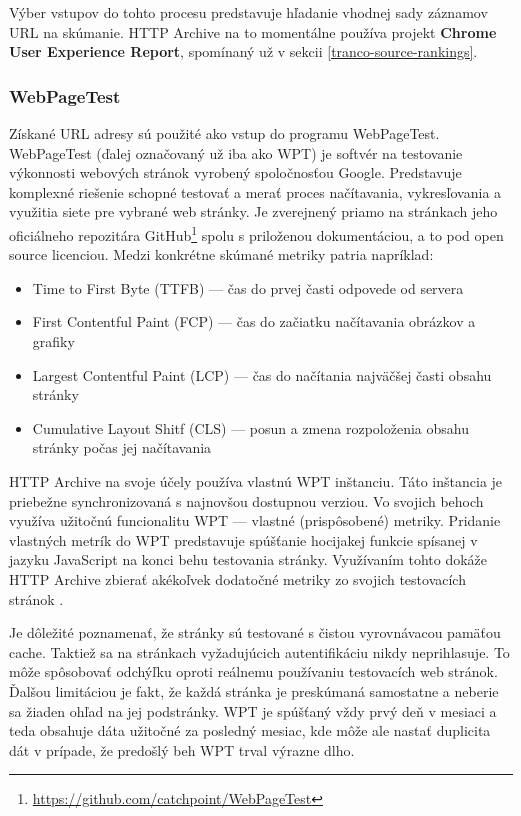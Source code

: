 Výber vstupov do tohto procesu predstavuje hľadanie vhodnej sady záznamov URL na skúmanie. 
HTTP Archive na to momentálne používa projekt \textbf{Chrome User Experience Report}, spomínaný už v sekcii \ref{tranco-source-rankings}.

\subsubsection{WebPageTest}

Získané URL adresy sú použité ako vstup do programu WebPageTest. WebPageTest (ďalej označovaný už iba ako WPT) je softvér na testovanie výkonnosti webových stránok vyrobený spoločnosťou Google. 
Predstavuje komplexné riešenie schopné testovať a merať proces načítavania, vykresľovania a využitia siete pre vybrané web stránky. 
Je zverejnený priamo na stránkach jeho oficiálneho repozitára GitHub\footnote{\href{https://github.com/catchpoint/WebPageTest}{https://github.com/catchpoint/WebPageTest}} spolu s priloženou dokumentáciou, a to pod open source licenciou.
Medzi konkrétne skúmané metriky patria napríklad: \cite{webpagetest}
\begin{itemize}
    \item Time to First Byte (TTFB) --- čas do prvej časti odpovede od servera
    \item First Contentful Paint (FCP) --- čas do začiatku načítavania obrázkov a grafiky
    \item Largest Contentful Paint (LCP) --- čas do načítania najväčšej časti obsahu stránky 
    \item Cumulative Layout Shitf (CLS) --- posun a zmena rozpoloženia obsahu stránky počas jej načítavania
\end{itemize}

HTTP Archive na svoje účely používa vlastnú WPT inštanciu. 
Táto inštancia je priebežne synchronizovaná s najnovšou dostupnou verziou.
Vo svojich behoch využíva užitočnú funcionalitu WPT --- vlastné (prispôsobené) metriky.
Pridanie vlastných metrík do WPT predstavuje spúšťanie hocijakej funkcie spísanej v jazyku JavaScript na konci behu testovania stránky. 
Využívaním tohto dokáže HTTP Archive zbierať akékoľvek dodatočné metriky zo svojich testovacích stránok \cite{webpagetest}.

Je dôležité poznamenať, že stránky sú testované s čistou vyrovnávacou pamäťou cache. 
Taktiež sa na stránkach vyžadujúcich autentifikáciu nikdy neprihlasuje.
To môže spôsobovať odchýľku oproti reálnemu používaniu testovacích web stránok. 
Ďalšou limitáciou je fakt, že každá stránka je preskúmaná samostatne a neberie sa žiaden ohľad na jej podstránky.
WPT je spúšťaný vždy prvý deň v mesiaci a teda obsahuje dáta užitočné za posledný mesiac, kde môže ale nastať duplicita dát v prípade, že predošlý beh WPT trval výrazne dlho.

